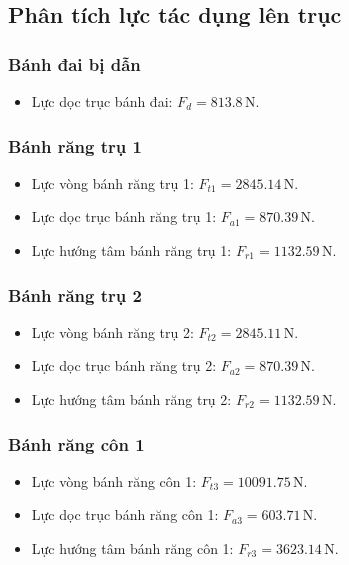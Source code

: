         \subsection{Phân tích lực tác dụng lên trục}
            \subsubsection{Bánh đai bị dẫn}
                \begin{itemize}
                    \item Lực dọc trục bánh đai: $F_d = 813.8\, \mathrm{N}$.
                \end{itemize}
            \subsubsection{Bánh răng trụ 1}
                \begin{itemize}
                    \item Lực vòng bánh răng trụ 1: $F_{t1} = 2845.14 \, \mathrm{N}$.
                    \item Lực dọc trục bánh răng trụ 1: $F_{a1} = 870.39 \, \mathrm{N}$.
                    \item Lực hướng tâm bánh răng trụ 1: $F_{r1} = 1132.59 \, \mathrm{N}$. 
                \end{itemize}
            \subsubsection{Bánh răng trụ 2}
                \begin{itemize}
                    \item Lực vòng bánh răng trụ 2: $F_{t2} = 2845.11\, \mathrm{N}$.
                    \item Lực dọc trục bánh răng trụ 2: $F_{a2} = 870.39\, \mathrm{N}$.
                    \item Lực hướng tâm bánh răng trụ 2: $F_{r2} = 1132.59\, \mathrm{N}$. 
                \end{itemize}
            \subsubsection{Bánh răng côn 1}
                \begin{itemize}
                    \item Lực vòng bánh răng côn 1: $F_{t3} = 10091.75\, \mathrm{N}$.       
                    \item Lực dọc trục bánh răng côn 1: $F_{a3} = 603.71\, \mathrm{N}$.
                    \item Lực hướng tâm bánh răng côn 1: $F_{r3} = 3623.14\, \mathrm{N}$. 
                \end{itemize}
            \newpage
